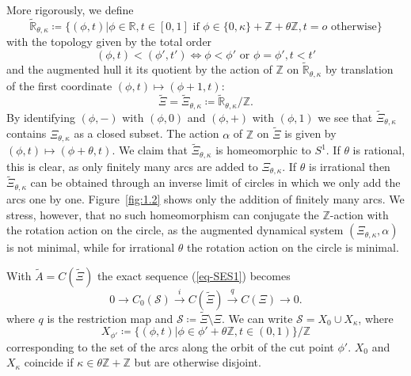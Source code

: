 \documentclass[11pt]{amsart}
\newcommand{\R}{\mathbb{R}}
\newcommand{\Z}{\mathbb{Z}}
\newcommand{\cut}{\kappa}
\begin{document}
More rigorously, we define 
\begin{equation*}\label{cut_up_circle_augmented}
	\tilde{\R}_{\theta, \cut}\coloneqq \{(\phi,t) | \phi\in \R,t \in [0,1]\mbox{ if }\phi\in
	\{0,\cut\}+\Z+\theta\Z, 
	t = o \mbox{ otherwise}\} 
\end{equation*}
with the topology given by the total order 
$$  (\phi,t) < (\phi',t') \Leftrightarrow \phi < \phi' \mbox{ or } 
\phi = \phi', t <t' $$
and the augmented hull it its quotient by  
the action of $\Z$ on $\tilde{\R}_{\theta, \cut}$ by translation of the first coordinate $(\phi,t)\mapsto (\phi+1,t)$:
$$\tilde{\Xi}=\tilde{\Xi}_{\theta, \cut}\coloneqq \tilde{\R}_{\theta, \cut}/\Z.$$ 
By identifying $(\phi,-)$ with $(\phi,0)$ and $(\phi,+)$ with $(\phi,1)$ we see that $\tilde{\Xi}_{\theta, \cut}$ contains ${\Xi}_{\theta, \cut}$ as a closed subset. 
The action $\alpha$ of $\Z$ on $\tilde\Xi$ is given by $(\phi, t)\mapsto (\phi+\theta, t)$. 
We claim that $\tilde{\Xi}_{\theta, \cut}$ is homeomorphic to $S^1$. If $\theta$ is rational, this is clear, as only finitely many arcs are added to ${\Xi}_{\theta, \cut}$. If $\theta$ is irrational then $\tilde{\Xi}_{\theta, \cut}$ can be obtained through an inverse limit of circles in which we only add the arcs one by one. 
Figure~\ref{fig:1.2} shows only the addition of finitely many arcs.
We stress, however, that no such homeomorphism can conjugate the $\Z$-action with the rotation action on the circle, as the augmented dynamical system $(\Xi_{\theta,\cut},\alpha)$ is not minimal, while for irrational $\theta$ the rotation action on the circle is minimal. 



With $\tilde{A}=C(\tilde{\Xi})$ the exact sequence (\ref{eq-SES1}) becomes
\begin{equation}\label{eq-SES2cut}
	0 \rightarrow C_0(\mathcal{S}) \xrightarrow{i}  C(\tilde{\Xi}) \xrightarrow{q} C({\Xi})
	\rightarrow 0.
\end{equation}
where $q$ is the restriction map and 
$\mathcal{S}\coloneqq\tilde{\Xi}\setminus\Xi$. We can write $\mathcal S=X_{0} \cup X_{\cut}$, where 
$$X_{\phi'} \coloneqq \{(\phi,t) | \phi\in \phi'+\theta\Z,t \in (0,1)
\}/\Z
$$ corresponding to the set of the arcs along the orbit of the cut point $\phi'$.
$X_0$ and $X_{\cut}$ coincide if $\cut\in \theta\Z+\Z$ but are otherwise disjoint.  
\end{document}
